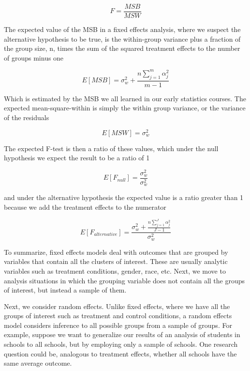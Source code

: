\[
F = \frac{MSB}{MSW}
\]

The expected value of the MSB in a fixed effects analysis, where we suspect the alternative hypothesis to be true, is the within-group variance plus a fraction of the group size, n, times the sum of the squared treatment effects  to the number of groups minus one

\[
E[MSB] = \sigma_w^2 + \frac{n\sum_{j=1}^m\alpha_j^2}{m-1}
\]

Which is estimated by the MSB we all learned in our early statistics courses. The expected mean-square-within is simply the within group variance, or the variance of the residuals

\[
E[MSW] = \sigma_w^2
\]

The expected F-test is then a ratio of these values, which under the null hypothesis we expect the result to be a ratio of 1

\[
E[F_{null}] = \frac{\sigma_w^2}{\sigma_w^2}
\]

and under the alternative hypothesis the expected value is a ratio greater than 1 because we add the treatment effects to the numerator

\[
E[F_{alternative}] = \frac{\sigma_w^2+\frac{n\sum_{j=1}^J\alpha_j^2}{J-1}}{\sigma_w^2}
\]

To summarize, fixed effects models deal with outcomes that are grouped by variables that contain all the clusters of interest. These are usually analytic variables such as treatment conditions, gender, race, etc. Next, we move to analysis situations in which the grouping variable does not contain all the groups of interest, but instead a sample of them.

Next, we consider random effects. Unlike fixed effects, where we have all the groups of interest such as treatment and control conditions, a random effects model considers inference to all possible groups from a sample of groups. For example, suppose we want to generalize our results of an analysis of students in schools to all schools, but by employing only a sample of schools. One research question could be, analogous to treatment effects, whether all schools have the same average outcome.

